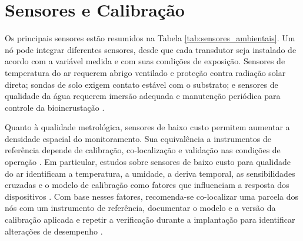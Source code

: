 \section{Sensores e Calibração}

Os principais sensores estão resumidos na Tabela \ref{tab:sensores_ambientais}.
Um nó pode integrar diferentes sensores, desde que cada transdutor seja instalado de acordo com a variável medida e com suas condições de exposição. Sensores de temperatura do ar requerem abrigo ventilado e proteção contra radiação solar direta; sondas de solo exigem contato estável com o substrato; e sensores de qualidade da água requerem imersão adequada e manutenção periódica para controle da bioincrustação \cite{5597912,10.1145/3005719,s23146332}.

Quanto à qualidade metrológica, sensores de baixo custo permitem aumentar a densidade espacial do monitoramento. Sua equivalência a instrumentos de referência depende de calibração, co-localização e validação nas condições de operação \cite{atmos10090506,KANG2022151769}.
Em particular, estudos sobre sensores de baixo custo para qualidade do ar identificam a temperatura, a umidade, a deriva temporal, as sensibilidades cruzadas e o modelo de calibração como fatores que influenciam a resposta dos dispositivos \cite{atmos10090506,KANG2022151769}.
Com base nesses fatores, recomenda-se co-localizar uma parcela dos nós com um instrumento de referência, documentar o modelo e a versão da calibração aplicada e repetir a verificação durante a implantação para identificar alterações de desempenho \cite{atmos10090506,KANG2022151769}.

